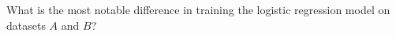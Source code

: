 \item {}
What is the most notable difference in training the logistic regression model
on datasets $A$ and $B$?

\ifnum{} {
  
} \fi
